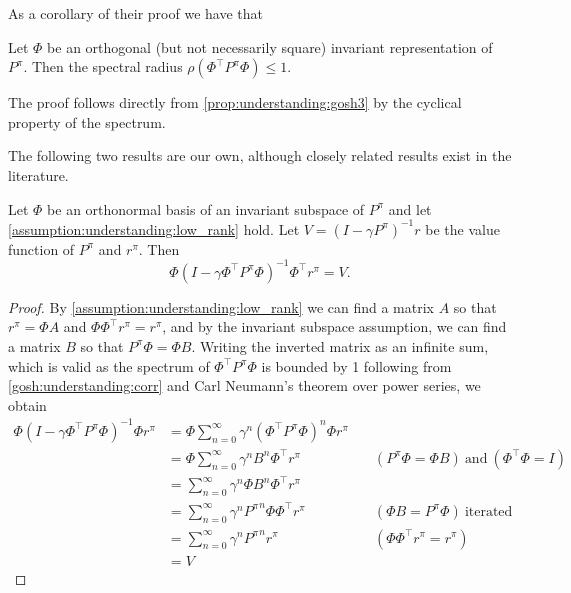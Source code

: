 As a corollary of their proof we have that 

\begin{lemma}\label{lem:understanding:gosh:corr}
    Let $\Phi$ be an orthogonal (but not necessarily square) invariant representation of $P^\pi$. Then the spectral radius $\rho(\Phi^\top P^\pi \Phi) \leq 1.$ 
\end{lemma}

The proof follows directly from \autoref{prop:understanding:gosh3} by the cyclical property of the spectrum.
    

The following two results are our own, although closely related results exist in the literature.

\begin{lemma}\label{lem:understanding:lossless_approx}
    Let $\Phi$ be an orthonormal basis of an invariant subspace of $P^\pi$ and let \autoref{assumption:understanding:low_rank} hold. Let $V = (I - \gamma P^\pi)^{-1} r$ be the value function of $P^\pi$ and $r^\pi$. Then $$\Phi (I - \gamma \Phi^\top P^\pi \Phi)^{-1} \Phi^\top r^\pi = V.$$
\end{lemma}
\begin{proof}
    By \autoref{assumption:understanding:low_rank} we can find a matrix $A$ so that $r^\pi = \Phi A$ and $\Phi\Phi^\top r^\pi = r^\pi$, and by the invariant subspace assumption, we can find a matrix $B$ so that $P^\pi \Phi = \Phi B$.
    Writing the inverted matrix as an infinite sum, which is valid as the spectrum of $\Phi^\top P^\pi \Phi$ is bounded by 1 following from \autoref{gosh:understanding:corr} and Carl Neumann's theorem over power series, we obtain
    \begin{align*}
        \Phi (I - \gamma \Phi^\top P^\pi \Phi)^{-1} \Phi r^\pi &= \Phi \sum_{n=0}^\infty \gamma^n (\Phi^\top P^\pi \Phi)^n \Phi r^\pi \\
        &= \Phi \sum_{n=0}^\infty \gamma^n B^n \Phi^\top r^\pi &\quad (P^\pi \Phi = \Phi B)~\text{and}~(\Phi^\top \Phi = I)\\
        &= \sum_{n=0}^\infty \gamma^n \Phi B^n \Phi^\top r^\pi \\
        &= \sum_{n=0}^\infty \gamma^n {P^\pi}^n \Phi\Phi^\top r^\pi &\quad (\Phi B = P^\pi \Phi)~\text{iterated} \\
        &= \sum_{n=0}^\infty \gamma^n {P^\pi}^n r^\pi &\quad (\Phi\Phi^\top r^\pi = r^\pi) \\
        &= V
    \end{align*}
\end{proof}



